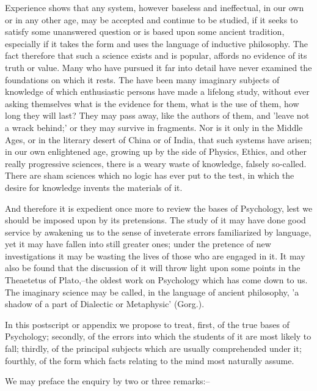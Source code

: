 Experience shows that any system, however baseless and ineffectual, in
our own or in any other age, may be accepted and continue to be studied,
if it seeks to satisfy some unanswered question or is based upon some
ancient tradition, especially if it takes the form and uses the language
of inductive philosophy. The fact therefore that such a science exists
and is popular, affords no evidence of its truth or value. Many who have
pursued it far into detail have never examined the foundations on which
it rests. The have been many imaginary subjects of knowledge of which
enthusiastic persons have made a lifelong study, without ever asking
themselves what is the evidence for them, what is the use of them, how
long they will last? They may pass away, like the authors of them, and
'leave not a wrack behind;' or they may survive in fragments. Nor is it
only in the Middle Ages, or in the literary desert of China or of India,
that such systems have arisen; in our own enlightened age, growing up
by the side of Physics, Ethics, and other really progressive sciences,
there is a weary waste of knowledge, falsely so-called. There are sham
sciences which no logic has ever put to the test, in which the desire
for knowledge invents the materials of it.

And therefore it is expedient once more to review the bases of
Psychology, lest we should be imposed upon by its pretensions. The
study of it may have done good service by awakening us to the sense of
inveterate errors familiarized by language, yet it may have fallen into
still greater ones; under the pretence of new investigations it may be
wasting the lives of those who are engaged in it. It may also be found
that the discussion of it will throw light upon some points in the
Theaetetus of Plato,--the oldest work on Psychology which has come down
to us. The imaginary science may be called, in the language of ancient
philosophy, 'a shadow of a part of Dialectic or Metaphysic' (Gorg.).

In this postscript or appendix we propose to treat, first, of the true
bases of Psychology; secondly, of the errors into which the students of
it are most likely to fall; thirdly, of the principal subjects which
are usually comprehended under it; fourthly, of the form which facts
relating to the mind most naturally assume.

We may preface the enquiry by two or three remarks:--

